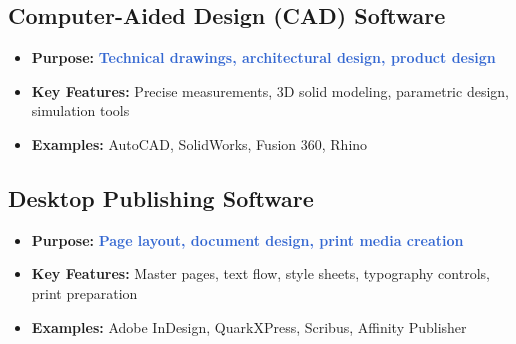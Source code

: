 \documentclass[12pt]{article}
\begin{document}
\subsection{Computer-Aided Design (CAD) Software}
\begin{itemize}
    \item \textbf{Purpose:} \textcolor{highlight}{\textbf{Technical drawings, architectural design, product design}}
    \item \textbf{Key Features:} Precise measurements, 3D solid modeling, parametric design, simulation tools
    \item \textbf{Examples:} AutoCAD, SolidWorks, Fusion 360, Rhino
\end{itemize}

\subsection{Desktop Publishing Software}
\begin{itemize}
    \item \textbf{Purpose:} \textcolor{highlight}{\textbf{Page layout, document design, print media creation}}
    \item \textbf{Key Features:} Master pages, text flow, style sheets, typography controls, print preparation
    \item \textbf{Examples:} Adobe InDesign, QuarkXPress, Scribus, Affinity Publisher
\end{itemize}
\end{document}
